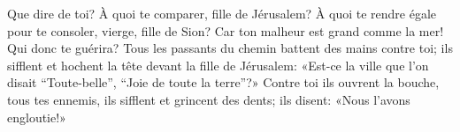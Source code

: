 Que dire de toi? À quoi te comparer, fille de Jérusalem?
À quoi te rendre égale pour te consoler, vierge, fille de Sion?
Car ton malheur est grand comme la mer!
	Qui donc te guérira?
Tous les passants du chemin battent des mains contre toi;
	ils sifflent et hochent la tête devant la fille de Jérusalem:
	«Est-ce la ville que l’on disait “Toute-belle”, “Joie de toute la terre”?»
Contre toi ils ouvrent la bouche, tous tes ennemis,
	ils sifflent et grincent des dents;
	ils disent: «Nous l’avons engloutie!»
